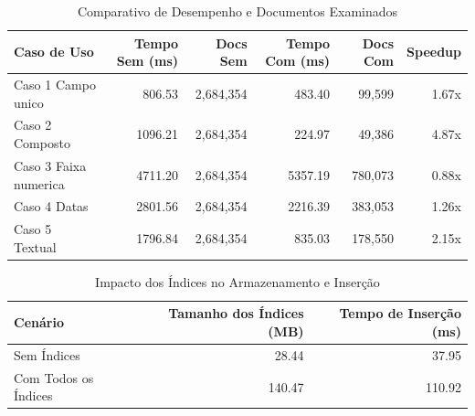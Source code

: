 \begin{table}[htpb]
\centering
\caption{Comparativo de Desempenho e Documentos Examinados}
\label{tab:resultados}
\begin{tabular}{l|rr|rr|r}
\hline
\textbf{Caso de Uso} & \textbf{Tempo Sem (ms)} & \textbf{Docs Sem} & \textbf{Tempo Com (ms)} & \textbf{Docs Com} & \textbf{Speedup} \\
\hline
Caso 1 Campo unico & 806.53 & 2,684,354 & 483.40 & 99,599 & 1.67x \\
Caso 2 Composto & 1096.21 & 2,684,354 & 224.97 & 49,386 & 4.87x \\
Caso 3 Faixa numerica & 4711.20 & 2,684,354 & 5357.19 & 780,073 & 0.88x \\
Caso 4 Datas & 2801.56 & 2,684,354 & 2216.39 & 383,053 & 1.26x \\
Caso 5 Textual & 1796.84 & 2,684,354 & 835.03 & 178,550 & 2.15x \\
\hline
\end{tabular}
\end{table}

\begin{table}[htpb]
\centering
\caption{Impacto dos Índices no Armazenamento e Inserção}
\label{tab:impacto_indices}
\begin{tabular}{l|rr}
\hline
\textbf{Cenário} & \textbf{Tamanho dos Índices (MB)} & \textbf{Tempo de Inserção (ms)} \\
\hline
Sem Índices & 28.44 & 37.95 \\
Com Todos os Índices & 140.47 & 110.92 \\
\hline
\end{tabular}
\end{table}